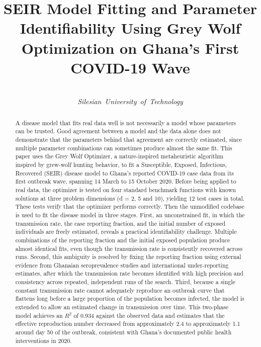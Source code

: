 \documentclass[journal]{IEEEtran}
\begin{document}
\title{SEIR Model Fitting and Parameter Identifiability Using Grey Wolf Optimization on Ghana's First COVID-19 Wave}

\author{\\ \mbox{\textit{Silesian University of Technology}}}

\maketitle

\begin{abstract}
A disease model that fits real data well is not necessarily a model whose parameters can be trusted. Good agreement between a model and the data alone does not demonstrate that the parameters behind that agreement are correctly estimated, since multiple parameter combinations can sometimes produce almost the same fit. This paper uses the Grey Wolf Optimizer, a nature-inspired metaheuristic algorithm inspired by grew-wolf hunting behavior, to fit a Susceptible, Exposed, Infectious, Recovered (SEIR) disease model to Ghana's reported COVID-19 case data from its first outbreak wave, spanning 14 March to 15 October 2020. Before being applied to real data, the optimizer is tested on four standard benchmark functions with known solutions at three problem dimensions (d = 2, 5 and 10), yielding 12 test cases in total. These tests verify that the optimizer performs correctly. Then the unmodified codebase is used to fit the disease model in three stages. First, an unconstrained fit, in which the transmission rate, the case reporting fraction, and the initial number of exposed individuals are freely estimated, reveals a practical identifiability challenge. Multiple combinations of the reporting fraction and the initial exposed population produce almost identical fits, even though the transmission rate is consistently recovered across runs. Second, this ambiguity is resolved by fixing the reporting fraction using external evidence from Ghanaian seroprevalence studies and international under-reporting estimates, after which the transmission rate becomes identified with high precision and consistency across repeated, independent runs of the search. Third, because a single constant transmission rate cannot adequately reproduce an outbreak curve that flattens long before a large proportion of the population becomes infected, the model is extended to allow an estimated change in transmission over time. This two-phase model achieves an $R^2$ of 0.934 against the observed data and estimates that the effective reproduction number decreased from approximately 2.4 to approximately 1.1 around day 50 of the outbreak, consistent with Ghana's documented public health interventions in 2020. 

\end{abstract}
\end{document}

